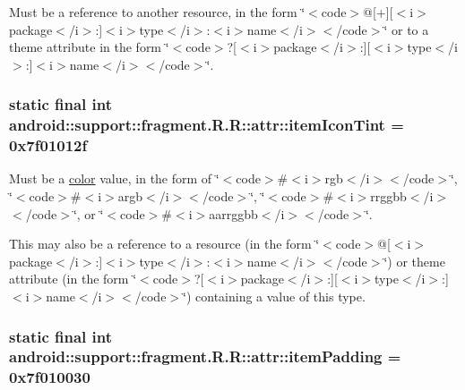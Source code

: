 Must be a reference to another resource, in the form \char`\"{}$<$code$>$@\mbox{[}+\mbox{]}\mbox{[}$<$i$>$package$<$/i$>$:\mbox{]}$<$i$>$type$<$/i$>$:$<$i$>$name$<$/i$>$$<$/code$>$\char`\"{} or to a theme attribute in the form \char`\"{}$<$code$>$?\mbox{[}$<$i$>$package$<$/i$>$:\mbox{]}\mbox{[}$<$i$>$type$<$/i$>$:\mbox{]}$<$i$>$name$<$/i$>$$<$/code$>$\char`\"{}. \hypertarget{classandroid_1_1support_1_1fragment_1_1_r_1_1attr_55100c10b30962522db51d7ad1a2fdb0}{
\subsubsection[{itemIconTint}]{\setlength{\rightskip}{0pt plus 5cm}static final int android::support::fragment.R.R::attr::itemIconTint = 0x7f01012f}}
\label{classandroid_1_1support_1_1fragment_1_1_r_1_1attr_55100c10b30962522db51d7ad1a2fdb0}


Must be a \hyperlink{classandroid_1_1support_1_1fragment_1_1_r_1_1color}{color} value, in the form of \char`\"{}$<$code$>$\#$<$i$>$rgb$<$/i$>$$<$/code$>$\char`\"{}, \char`\"{}$<$code$>$\#$<$i$>$argb$<$/i$>$$<$/code$>$\char`\"{}, \char`\"{}$<$code$>$\#$<$i$>$rrggbb$<$/i$>$$<$/code$>$\char`\"{}, or \char`\"{}$<$code$>$\#$<$i$>$aarrggbb$<$/i$>$$<$/code$>$\char`\"{}. 

This may also be a reference to a resource (in the form \char`\"{}$<$code$>$@\mbox{[}$<$i$>$package$<$/i$>$:\mbox{]}$<$i$>$type$<$/i$>$:$<$i$>$name$<$/i$>$$<$/code$>$\char`\"{}) or theme attribute (in the form \char`\"{}$<$code$>$?\mbox{[}$<$i$>$package$<$/i$>$:\mbox{]}\mbox{[}$<$i$>$type$<$/i$>$:\mbox{]}$<$i$>$name$<$/i$>$$<$/code$>$\char`\"{}) containing a value of this type. \hypertarget{classandroid_1_1support_1_1fragment_1_1_r_1_1attr_3e24de0a882d65ede511852cec025c5d}{
\subsubsection[{itemPadding}]{\setlength{\rightskip}{0pt plus 5cm}static final int android::support::fragment.R.R::attr::itemPadding = 0x7f010030}}
\label{classandroid_1_1support_1_1fragment_1_1_r_1_1attr_3e24de0a882d65ede511852cec025c5d}


